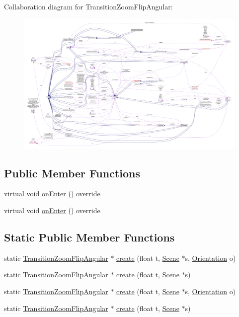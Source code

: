 Collaboration diagram for Transition\+Zoom\+Flip\+Angular\+:
\nopagebreak
\begin{figure}[H]
\begin{center}
\leavevmode
\includegraphics[width=350pt]{classTransitionZoomFlipAngular__coll__graph}
\end{center}
\end{figure}
\subsection*{Public Member Functions}
\begin{DoxyCompactItemize}
\item 
virtual void \hyperlink{classTransitionZoomFlipAngular_aabb32c716e6bcc7d75b1ac65e2b4d577}{on\+Enter} () override
\item 
virtual void \hyperlink{classTransitionZoomFlipAngular_aacb744aa3be41964b84c4413472cb456}{on\+Enter} () override
\end{DoxyCompactItemize}
\subsection*{Static Public Member Functions}
\begin{DoxyCompactItemize}
\item 
static \hyperlink{classTransitionZoomFlipAngular}{Transition\+Zoom\+Flip\+Angular} $\ast$ \hyperlink{classTransitionZoomFlipAngular_a27ffb117d72758cf7a9ec288feef5375}{create} (float t, \hyperlink{classScene}{Scene} $\ast$s, \hyperlink{classTransitionScene_a0b2b247806fb10a20de0cbc554210c4d}{Orientation} o)
\item 
static \hyperlink{classTransitionZoomFlipAngular}{Transition\+Zoom\+Flip\+Angular} $\ast$ \hyperlink{classTransitionZoomFlipAngular_a232189ce28db14217e187401a70533a7}{create} (float t, \hyperlink{classScene}{Scene} $\ast$s)
\item 
static \hyperlink{classTransitionZoomFlipAngular}{Transition\+Zoom\+Flip\+Angular} $\ast$ \hyperlink{classTransitionZoomFlipAngular_af7b6d639236ed7925f91f26b76943812}{create} (float t, \hyperlink{classScene}{Scene} $\ast$s, \hyperlink{classTransitionScene_a0b2b247806fb10a20de0cbc554210c4d}{Orientation} o)
\item 
static \hyperlink{classTransitionZoomFlipAngular}{Transition\+Zoom\+Flip\+Angular} $\ast$ \hyperlink{classTransitionZoomFlipAngular_a07a47763505a34054ba0173ccc0e1378}{create} (float t, \hyperlink{classScene}{Scene} $\ast$s)
\end{DoxyCompactItemize}
